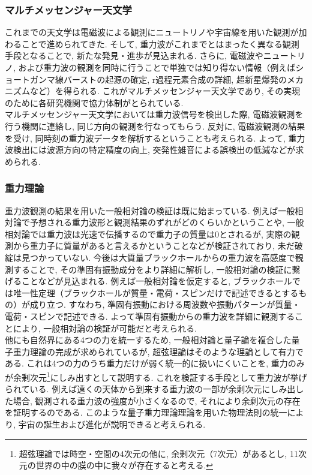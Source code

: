 \subsubsection{マルチメッセンジャー天文学}
\vskip3mm
これまでの天文学は電磁波による観測にニュートリノや宇宙線を用いた観測が加わることで進められてきた. そして, 重力波がこれまでとはまったく異なる観測手段となることで, 新たな発見・進歩が見込まれる. さらに, 電磁波やニュートリノ, および重力波の観測を同時に行うことで単独では知り得ない情報（例えばショートガンマ線バーストの起源の確定, r過程元素合成の詳細, 超新星爆発のメカニズムなど）を得られる\cite{22}. これがマルチメッセンジャー天文学であり, その実現のために各研究機関で協力体制がとられている. \\
\quad マルチメッセンジャー天文学においては重力波信号を検出した際, 電磁波観測を行う機関に連絡し, 同じ方向の観測を行なってもらう. 反対に, 電磁波観測の結果を受け, 同時刻の重力波データを解析するということも考えられる. よって, 重力波検出には波源方向の特定精度の向上, 突発性雑音による誤検出の低減などが求められる. 
\subsubsection{重力理論}
\vskip3mm
重力波観測の結果を用いた一般相対論の検証は既に始まっている. 例えば一般相対論で予想される重力波形と観測結果のずれがどのくらいかということや, 一般相対論では重力波は光速で伝播するので重力子の質量は0とされるが, 実際の観測から重力子に質量があると言えるかということなどが検証されており, 未だ破綻は見つかっていない\cite{23}. 今後は大質量ブラックホールからの重力波を高感度で観測することで, その準固有振動成分をより詳細に解析し, 一般相対論の検証に繋げることなどが見込まれる. 例えば一般相対論を仮定すると, ブラックホールでは唯一性定理（ブラックホールが質量・電荷・スピンだけで記述できるとするもの）が成り立つ. すなわち, 準固有振動における周波数や振動パターンが質量・電荷・スピンで記述できる. よって準固有振動からの重力波を詳細に観測することにより, 一般相対論の検証が可能だと考えられる. \\
\quad 他にも自然界にある4つの力を統一するため, 一般相対論と量子論を複合した量子重力理論の完成が求められているが, 超弦理論はそのような理論として有力である. これは4つの力のうち重力だけが弱く統一的に扱いにくいことを, 重力のみが余剰次元\footnote{超弦理論では時空・空間の4次元の他に, 余剰次元（7次元）があるとし, 11次元の世界の中の膜の中に我々が存在すると考える. }にしみ出すとして説明する. これを検証する手段として重力波が挙げられている. 例えば遠くの天体から到来する重力波の一部が余剰次元にしみ出した場合, 観測される重力波の強度が小さくなるので, それにより余剰次元の存在を証明するのである. このような量子重力理論理論を用いた物理法則の統一により, 宇宙の誕生および進化が説明できると考えられる. 
